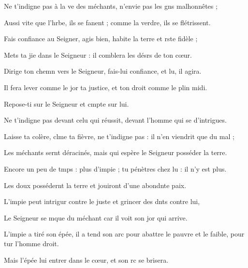 \item Ne t’indigne pas à la ve des méchants,\psstar{} n’envie pas les gns malhonnêtes ;
\item Aussi vite que l’hrbe, ils se fanent ;\psstar{} comme la verdre, ils se flétrissent.
\item Fais confiance au Seigner, agis bien,\psstar{} habite la terre et rste fidèle ;
\item Mets ta jie dans le Seigneur :\psstar{} il comblera les désrs de ton cœur.
\item Dirige ton chemn vers le Seigneur,\psstar{} fais-lui confiance, et lu, il agira.
\item Il fera lever comme le jor ta justice,\psstar{} et ton droit comme le plin midi.
\item Repose-ti sur le Seigneur\psstar{} et cmpte sur lui. 
\item Ne t’indigne pas devant celu qui réussit,\psstar{} devant l’homme qui se d’intrigues.
\item Laisse ta colère, clme ta fièvre,\psstar{} ne t’indigne pas : il n’en viendrit que du mal ;
\item Les méchants sernt déracinés,\psstar{} mais qui espère le Seigneur posséder la terre.
\item Encore un peu de tmps : plus d’impie ;\psstar{} tu pénètres chez lu : il n’y est plus.
\item Les doux possédernt la terre\psstar{} et jouiront d’une abondnte paix.
\item L’impie peut intrigur contre le juste\psstar{} et grincer des dnts contre lui,
\item Le Seigneur se mque du méchant\psstar{} car il voit son jor qui arrive.
\item L’impie a tiré son épée, il a tend son arc\psstar{} pour abattre le pauvre et le faible, pour tur l’homme droit.
\item Mais l’épée lui entrer dans le cœur,\psstar{} et son rc se brisera.